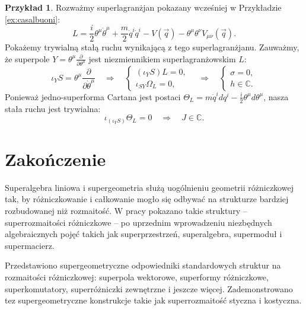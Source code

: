 \documentclass[11pt,a4paper]{report}
\theoremstyle{definition}
\newtheorem{example}[theorem]{Przykład}
\begin{document}
\begin{example}
	Rozważmy superlagranżjan pokazany wcześniej w Przykładzie \ref{ex:casalbuoni}:
	\begin{equation*}
		L = \frac{i}{2} \theta^\mu \dot{\theta}^\mu + \frac{m}{2} \dot{q}^i \dot{q}^i   - V(\overrightarrow{q}) - \theta^\mu \theta^\nu V_{\mu \nu} (\overrightarrow{q}).
	\end{equation*}
	Pokażemy trywialną stałą ruchu wynikającą z tego superlagranżjanu. Zauważmy, że superpole $Y=\theta^\mu \frac{\partial}{\partial \theta^\mu}$ jest niezmiennikiem superlagranżowskim $L$:
	\begin{equation*}
		\iota_Y S = \theta^\mu \frac{\partial}{\partial \dot \theta^\mu} \quad \Rightarrow \quad \left\{ \begin{array}{l}
		(\iota_Y S) L = 0, \\
		\iota_{SY} \Omega_L = 0,
		\end{array}\right. 
		\quad \Rightarrow \quad \left\{ \begin{array}{l}
		\sigma = 0, \\
		h \in \mathbb{C}.
		\end{array}\right.
	\end{equation*}
	Ponieważ jedno-superforma Cartana jest postaci $\Theta_L = m \dot q^i dq^i - \frac{i}{2} \theta^\mu d \theta^\mu$, nasza stała ruchu jest trywialna:
	\begin{equation*}
		\iota_{(\iota_Y S)} \Theta_L = 0 \quad \Rightarrow \quad J \in \mathbb{C}.
	\end{equation*}
\end{example}
			      				
\newpage
\chapter*{Zakończenie}
Superalgebra liniowa i supergeometria służą uogólnieniu geometrii różniczkowej tak, by różniczkowanie i całkowanie mogło się odbywać na strukturze bardziej rozbudowanej niż rozmaitość. W pracy pokazano takie struktury -- superrozmaitości różniczkowe -- po uprzednim wprowadzeniu niezbędnych algebraicznych pojęć takich jak superprzestrzeń, superalgebra, supermoduł i supermacierz.
			      				
Przedstawiono supergeometryczne odpowiedniki standardowych struktur na rozmaitości różniczkowej: superpola wektorowe, superformy różniczkowe, superkomutatory, superróżniczki zewnętrzne i jeszcze więcej. Zademonstrowano tez supergeometryczne konstrukcje takie jak superrozmaitość styczna i kostyczna.
			      				
\end{document}
